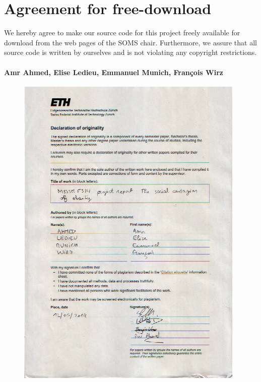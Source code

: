 \documentclass[11pt]{article}
\author{Amr Ahmed, Elise Ledieu, Emmanuel Munich, Fran\c{c}ois Wirz}
\begin{document}

\newpage


\newpage
\section*{Agreement for free-download}
\bigskip


\bigskip


\large We hereby agree to make our source code for this project freely available for download from the web pages of the SOMS chair. Furthermore, we assure that all source code is written by ourselves and is not violating any copyright restrictions.

\begin{center}

\bigskip


\bigskip


\paragraph{Amr Ahmed, Elise Ledieu, Emmanuel Munich, Fran\c{c}ois Wirz}

\end{center}
\newpage



\newpage


\begin{figure}[H]
   \includegraphics[height=\textheight,keepaspectratio]{chartre.png}
\end{figure}
\end{document}
